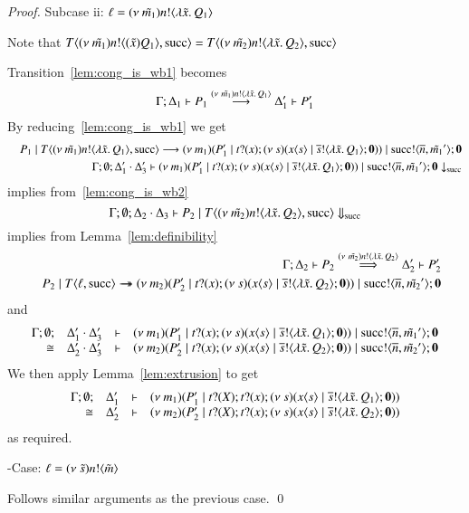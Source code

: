 \begin{proof}
	\noi Subcase ii: $\ell = (\nu\ \tilde{m_1}) n ! \langle \lambda \tilde{x}.\,Q_1 \rangle$

	\noi Note that $T\langle (\nu\ \tilde{m_1}) n ! \langle (\tilde{x}) Q_1 \rangle, \textrm{succ} \rangle = T\langle (\nu\ \tilde{m_2}) n ! \langle \lambda \tilde{x}.\,Q_2 \rangle, \textrm{succ} \rangle$

	\noi Transition~\ref{lem:cong_is_wb1} becomes
%
	\begin{eqnarray}
		\Gamma; \Delta_1 \vdash P_1 \stackrel{(\nu\ \tilde{m_1}) n ! \langle \lambda \tilde{x}.\,Q_1 \rangle}{\longrightarrow} \Delta_1' \vdash P_1'
		\label{lem:cong_is_wb3}
	\end{eqnarray}
%
	\noi By reducing~\ref{lem:cong_is_wb1} we get
%
	\begin{eqnarray*}
		&& P_1 \;|\; T\langle (\nu\ \tilde{m_1}) n ! \langle \lambda \tilde{x}.\,Q_1 \rangle, \textrm{succ} \rangle
		\longrightarrow
		(\nu\ m_1)(P_1' \;|\; t ? (x) ; (\nu\ s)(x\langle s \rangle \;|\; \overline{s} ! \langle \lambda \tilde{x}.\,Q_1 \rangle ; \mathbf{0})) \;|\; \textrm{succ} ! \langle \overline{n}, \tilde{m_1}' \rangle ; \mathbf{0} \\
		&& \Gamma; \emptyset; \Delta_1' \cdot \Delta_3' \vdash (\nu\ m_1)(P_1' \;|\; t ? (x) ; (\nu\ s)(x\langle s \rangle \;|\; \overline{s} ! \langle \lambda \tilde{x}.\,Q_1 \rangle ; \mathbf{0})) \;|\; \textrm{succ} ! \langle \overline{n}, \tilde{m_1}' \rangle ; \mathbf{0} \downarrow_{\textrm{succ}}
	\end{eqnarray*}
%
	\noi implies from~\ref{lem:cong_is_wb2}
%
	\[
		\Gamma; \emptyset; \Delta_2 \cdot \Delta_3 \vdash P_2 \;|\; T\langle (\nu\ \tilde{m_2}) n ! \langle \lambda \tilde{x}.\,Q_2 \rangle, \textrm{succ} \rangle \Downarrow_{\textrm{succ}}
	\]
%
	\noi implies from Lemma~\ref{lem:definibility}
%
	\begin{eqnarray}
		&& \Gamma; \Delta_2 \vdash P_2 \stackrel{(\nu\ \tilde{m_2}) n ! \langle \lambda \tilde{x}.\,Q_2 \rangle}{\Longrightarrow} \Delta_2' \vdash P_2'
		\label{lem:cong_is_wb4}\\
		&& P_2 \;|\; T \langle \ell, \textrm{succ} \rangle \rightarrow\!\!\!\!\!\rightarrow (\nu\ m_2)(P_2' \;|\; t ? (x) ; (\nu\ s)(x\langle s \rangle \;|\; \overline{s} ! \langle \lambda \tilde{x}.\,Q_2 \rangle ; \mathbf{0})) \;|\; \textrm{succ} ! \langle \overline{n}, \tilde{m_2}' \rangle ; \mathbf{0} \nonumber
	\end{eqnarray}
%
	\noi and
%
	\[
		\begin{array}{rcll} \Gamma; \emptyset; &\Delta_1' \cdot \Delta_3'& \vdash& (\nu\ m_1)(P_1' \;|\; t ? (x) ; (\nu\ s)(x\langle s \rangle \;|\; \overline{s} ! \langle \lambda \tilde{x}.\,Q_1 \rangle ; \mathbf{0})) \;|\; \textrm{succ} ! \langle \overline{n}, \tilde{m_1}' \rangle ; \mathbf{0}\\ \cong &\Delta_2' \cdot \Delta_3'& \vdash &  (\nu\ m_2)(P_2' \;|\; t ? (x) ; (\nu\ s)(x\langle s \rangle \;|\; \overline{s} ! \langle \lambda \tilde{x}.\,Q_2 \rangle ; \mathbf{0})) \;|\; \textrm{succ} ! \langle \overline{n}, \tilde{m_2}' \rangle ; \mathbf{0} \end{array}
	\]
%
	\noi We then apply Lemma~\ref{lem:extrusion} to get
%
	\[
		\begin{array}{rcll} \Gamma; \emptyset; &\Delta_1'& \vdash& (\nu\ m_1)(P_1' \;|\; t ? (X) ; t ? (x) ; (\nu\ s)(x\langle s \rangle \;|\; \overline{s} ! \langle \lambda \tilde{x}.\,Q_1 \rangle ; \mathbf{0}))\\ \cong &\Delta_2'& \vdash &  (\nu\ m_2)(P_2' \;|\; t ? (X) ; t ? (x) ; (\nu\ s)(x\langle s \rangle \;|\; \overline{s} ! \langle \lambda \tilde{x}.\,Q_2 \rangle ; \mathbf{0})) \end{array}
	\]
%
	\noi as required.

	\noi -Case: $\ell = (\nu\ \tilde{s}) n ! \langle \tilde{m} \rangle$

	\noi Follows similar arguments as the previous case.
	\qed
\end{proof}

